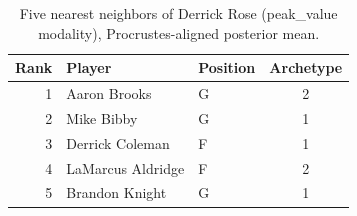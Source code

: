 \begin{table}[htbp]
  \centering\small
  \begin{tabular}{rllc}
    \toprule
    Rank & Player & Position & Archetype \\
    \midrule
    1 & Aaron Brooks & G & 2 \\
    2 & Mike Bibby & G & 1 \\
    3 & Derrick Coleman & F & 1 \\
    4 & LaMarcus Aldridge & F & 2 \\
    5 & Brandon Knight & G & 1 \\
    \bottomrule
  \end{tabular}
  \caption{Five nearest neighbors of Derrick Rose (peak_value modality), Procrustes-aligned posterior mean.}
  \label{tab:Derrick_Rose_neighbors_peak_value}
\end{table}

